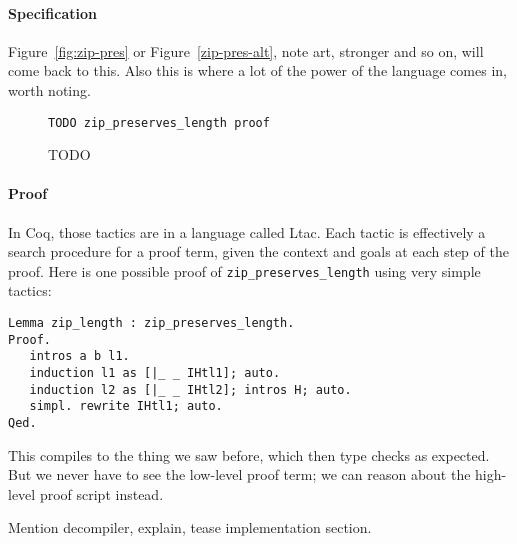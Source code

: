 \paragraph{Specification} Figure~\ref{fig:zip-pres} or Figure~\ref{zip-pres-alt}, note art, stronger and so on, will come back to this.
Also this is where a lot of the power of the language comes in, worth noting.

\begin{figure}
\begin{lstlisting}
TODO zip_preserves_length proof
\end{lstlisting}
\caption{TODO}
\label{fig:zip-pres-proof}
\end{figure}

\paragraph{Proof} 
In Coq, those tactics are in a language called Ltac.
Each tactic is effectively a search procedure for a proof term, given the context and goals at each step of the proof.
Here is one possible proof of \lstinline{zip_preserves_length} using very simple tactics:
\begin{lstlisting}
Lemma zip_length : zip_preserves_length.
Proof.
   intros a b l1.
   induction l1 as [|_ _ IHtl1]; auto.
   induction l2 as [|_ _ IHtl2]; intros H; auto.
   simpl. rewrite IHtl1; auto.
Qed.
\end{lstlisting}
This compiles to the thing we saw before, which then type checks as expected.
But we never have to see the low-level proof term; we can reason about the high-level proof script instead.

Mention decompiler, explain, tease implementation section.




